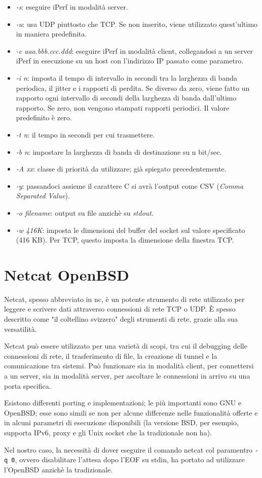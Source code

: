 \begin{itemize}
    \item \textit{-s}: eseguire iPerf in modalità server.
    \item \textit{-u}: usa UDP piuttosto che TCP. Se non inserito, viene utilizzato quest'ultimo in maniera predefinita.
    \item \textit{-c aaa.bbb.ccc.ddd}: eseguire iPerf in modalità client, collegandosi a un server iPerf in esecuzione su un host con l'indirizzo IP passato come parametro.
    \item \textit{-i n}: imposta il tempo di intervallo in secondi tra la larghezza di banda periodica, il jitter e i rapporti di perdita. Se diverso da zero, viene fatto un rapporto ogni intervallo di secondi della larghezza di banda dall'ultimo rapporto. Se zero, non vengono stampati rapporti periodici. Il valore predefinito è zero.
    \item \textit{-t n}: il tempo in secondi per cui trasmettere.
    \item \textit{-b n}: impostare la larghezza di banda di destinazione su n bit/sec.
    \item \textit{-A xx}: classe di priorità da utilizzare; già spiegato precedentemente.
    \item \textit{-y}: passandoci assieme il carattere C si avrà l'output come CSV (\textit{Comma Separated Value}).
    \item \textit{-o filename}: output su file anzichè su \textit{stdout}.
    \item \textit{-w 416K}: imposta le dimensioni del buffer del socket sul valore specificato (416 KB). Per TCP, questo imposta la dimensione della finestra TCP.
\end{itemize}

\section{Netcat OpenBSD}
Netcat, spesso abbreviato in nc, è un potente strumento di rete utilizzato per leggere e scrivere dati attraverso connessioni di rete TCP o UDP. È spesso descritto come "il coltellino svizzero" degli strumenti di rete, grazie alla sua versatilità.

Netcat può essere utilizzato per una varietà di scopi, tra cui il debugging delle connessioni di rete, il trasferimento di file, la creazione di tunnel e la comunicazione tra sistemi. Può funzionare sia in modalità client, per connettersi a un server, sia in modalità server, per ascoltare le connessioni in arrivo su una porta specifica.

Esistono differenti porting e implementazioni; le più importanti sono GNU e OpenBSD; esse sono simili se non per alcune differenze nelle funzionalità offerte e in alcuni parametri di esecuzione disponibili (la versione BSD, per esempio, supporta IPv6, proxy e gli Unix socket che la tradizionale non ha). 

Nel nostro caso, la necessità di dover eseguire il comando netcat col paramentro \verb|-q 0|, ovvero disabilitare l'attesa dopo l'EOF su stdin, ha portato ad utilizzare l'OpenBSD anzichè la tradizionale.
